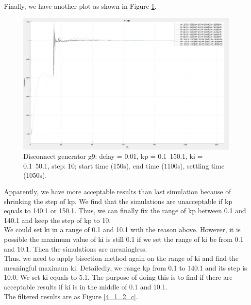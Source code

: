 \documentclass{report}
\begin{document}
Finally, we have another plot as shown in Figure \textcolor{red}{\ref{4_1_2_b}}. \\

\begin{figure}[htbp]
\centering
\includegraphics[width = .819\textwidth]{figure/4_1_2_b.png}
\caption{Disconnect generator g9: delay = 0.01, kp = 0.1~150.1, ki = 0.1~50.1, step: 10; start time (150s), end time (1100s), settling time (1050s).}
\label{4_1_2_b}
\end{figure}


Apparently, we have more acceptable results than last simulation because of shrinking the step of kp. We find that the simulations are unacceptable if kp equals to 140.1 or 150.1. Thus, we can finally fix the range of kp between 0.1 and 140.1 and keep the step of kp to 10. \\

We could set ki in a range of 0.1 and 10.1 with the reason above. However, it is possible the maximum value of ki is still 0.1 if we set the range of ki be from 0.1 and 10.1. Then the simulations are meaningless. \\

Thus, we need to apply bisection method again on the range of ki and find the meaningful maximum ki. Detailedly, we range kp from 0.1 to 140.1 and its step is 10.0. We set ki equals to 5.1. The purpose of doing this is to find if there are acceptable results if ki is in the middle of 0.1 and 10.1.\\   

The filtered results are as Figure \textcolor{red}{\ref{4_1_2_c}}. \\
\end{document}
